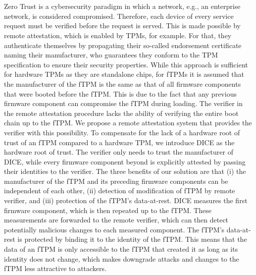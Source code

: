 \chapter{\abstractname}

Zero Trust is a cybersecurity paradigm in which a network, e.g., an enterprise network, is considered compromised.
Therefore, each device of every service request must be verified before the request is served.
This is made possible by remote attestation, which is enabled by \acp{TPM}, for example.
For that, they authenticate themselves by propagating their so-called endorsement certificate naming their manufacturer, who guarantees they conform to the TPM specification to ensure their security properties.
While this approach is sufficient for hardware TPMs as they are standalone chips, for \acp{fTPM} it is assumed that the manufacturer of the \ac{fTPM} is the same as that of all firmware components that were booted before the \ac{fTPM}\@.
This is due to the fact that any previous firmware component can compromise the \ac{fTPM} during loading.
The verifier in the remote attestation procedure lacks the ability of verifying the entire boot chain up to the \ac{fTPM}\@.
We propose a remote attestation system that provides the verifier with this possibility.
To compensate for the lack of a hardware root of trust of an \ac{fTPM} compared to a hardware TPM, we introduce DICE as the hardware root of trust.
The verifier only needs to trust the manufacturer of DICE, while every firmware component beyond is explicitly attested by passing their identities to the verifier.
The three benefits of our solution are that (i) the manufacturer of the \ac{fTPM} and its preceding firmware components can be independent of each other, (ii) detection of modification of \ac{fTPM} by remote verifier, and (iii) protection of the \ac{fTPM}'s data-at-rest.
DICE measures the first firmware component, which is then repeated up to the \ac{fTPM}\@.
These measurements are forwarded to the remote verifier, which can then detect potentially malicious changes to each measured component.
The \ac{fTPM}'s data-at-rest is protected by binding it to the identity of the \ac{fTPM}\@.
This means that the data of an \ac{fTPM} is only accessible to the \ac{fTPM} that created it as long as its identity does not change, which makes downgrade attacks and changes to the \ac{fTPM} less attractive to attackers.
